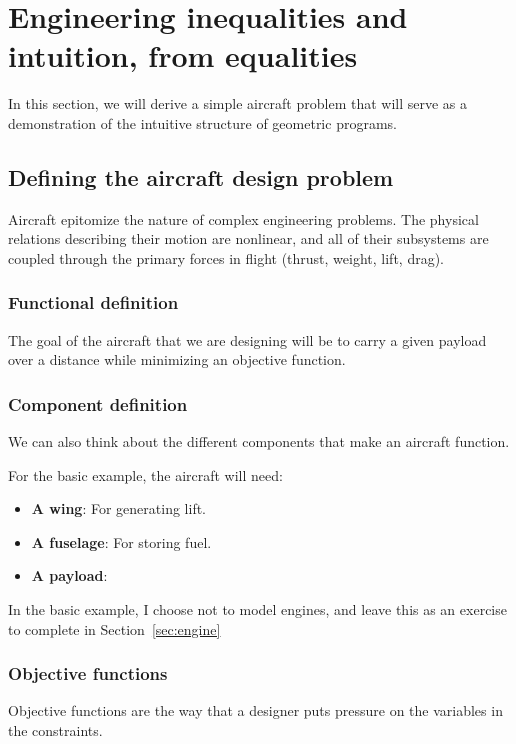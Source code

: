 \chapter{Engineering inequalities and intuition, from equalities}

In this section, we will derive a simple aircraft problem that will serve as 
a demonstration of the intuitive structure of geometric programs. 

\section{Defining the aircraft design problem}

Aircraft epitomize the nature of complex engineering problems. The physical 
relations describing their motion are nonlinear, and all of their subsystems are 
coupled through the primary forces in flight (thrust, weight, lift, drag). 

\subsection{Functional definition}

The goal of the aircraft that we are designing will be to carry a given payload
over a distance while minimizing an objective function. 

\subsection{Component definition}

We can also think about the different components that make an aircraft function. 

For the basic example, the aircraft will need:
\begin{itemize}
	\item \textbf{A wing}: For generating lift. 
	\item \textbf{A fuselage}: For storing fuel. 
	\item \textbf{A payload}:
\end{itemize}

In the basic example, I choose not to model engines, and leave this as an exercise
to complete in Section~\ref{sec:engine}

\subsection{Objective functions}

Objective functions are the way that a designer puts pressure on the variables 
in the constraints. 

